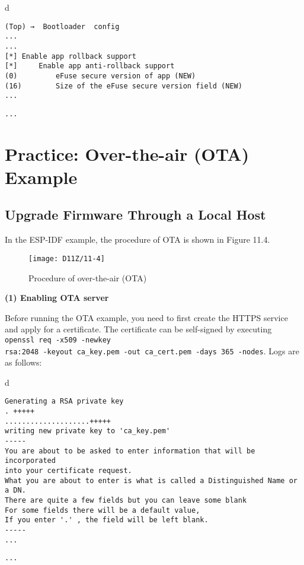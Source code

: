 \documentclass[a4paper,12pt]{book}
\begin{document}
\begin{codebloc}
\begin{tabular}{d}
\vspace{2pt}
\begin{verbatim}
(Top) →  Bootloader  config
...
...
[*] Enable app rollback support
[*]     Enable app anti-rollback support
(0)         eFuse secure version of app (NEW)
(16)        Size of the eFuse secure version field (NEW)
...
\end{verbatim}
\verb|...|
\end{tabular}
\end{codebloc}

\section{Practice: Over-the-air (OTA) Example}
\subsection{Upgrade Firmware Through a Local Host}
In the ESP-IDF example, the procedure of OTA is shown in Figure 11.4.

\begin{figure}[!h]
    \centering
    \texttt{[image: D11Z/11-4]}
    \caption{Procedure of over-the-air (OTA)}
\end{figure}

\textbf{(1) Enabling OTA server}

Before running the OTA example, you need to first create the HTTPS service and apply for a certificate. The certificate can be self-signed by executing \verb|openssl req -x509 -newkey|\\ \verb|rsa:2048 -keyout ca_key.pem -out ca_cert.pem -days 365 -nodes|. Logs are as follows:

\begin{codebloc}
\begin{tabular}{d}
\vspace{2pt}
\begin{verbatim}
Generating a RSA private key 
. +++++
....................+++++
writing new private key to 'ca_key.pem'
-----
You are about to be asked to enter information that will be incorporated
into your certificate request.
What you are about to enter is what is called a Distinguished Name or a DN.
There are quite a few fields but you can leave some blank
For some fields there will be a default value,
If you enter '.' , the field will be left blank.
-----
...
\end{verbatim}
\verb|...|
\end{tabular}
\end{codebloc}
\end{document}
